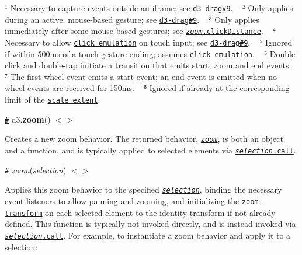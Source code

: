 ¹ Necessary to capture events outside an iframe; see \href{https://github.com/d3/d3-drag/issues/9}{\tt d3-\/drag\#9}. ~\newline
² Only applies during an active, mouse-\/based gesture; see \href{https://github.com/d3/d3-drag/issues/9}{\tt d3-\/drag\#9}. ~\newline
³ Only applies immediately after some mouse-\/based gestures; see \href{#zoom_clickDistance}{\tt {\itshape zoom}.click\+Distance}. ~\newline
⁴ Necessary to allow \href{https://developer.apple.com/library/ios/documentation/AppleApplications/Reference/SafariWebContent/HandlingEvents/HandlingEvents.html#//apple_ref/doc/uid/TP40006511-SW7}{\tt click emulation} on touch input; see \href{https://github.com/d3/d3-drag/issues/9}{\tt d3-\/drag\#9}. ~\newline
⁵ Ignored if within 500ms of a touch gesture ending; assumes \href{https://developer.apple.com/library/ios/documentation/AppleApplications/Reference/SafariWebContent/HandlingEvents/HandlingEvents.html#//apple_ref/doc/uid/TP40006511-SW7}{\tt click emulation}. ~\newline
⁶ Double-\/click and double-\/tap initiate a transition that emits start, zoom and end events. ~\newline
⁷ The first wheel event emits a start event; an end event is emitted when no wheel events are received for 150ms. ~\newline
⁸ Ignored if already at the corresponding limit of the \href{#zoom_scaleExtent}{\tt scale extent}.

\href{#zoom}{\tt \#} d3.{\bfseries zoom}() \href{https://github.com/d3/d3-zoom/blob/master/src/zoom.js}{\tt $<$$>$}

Creates a new zoom behavior. The returned behavior, \href{#_drag}{\tt {\itshape zoom}}, is both an object and a function, and is typically applied to selected elements via \href{https://github.com/d3/d3-selection#selection_call}{\tt {\itshape selection}.call}.

\href{#_zoom}{\tt \#} {\itshape zoom}({\itshape selection}) \href{https://github.com/d3/d3-zoom/blob/master/src/zoom.js#L62}{\tt $<$$>$}

Applies this zoom behavior to the specified \href{https://github.com/d3/d3-selection}{\tt {\itshape selection}}, binding the necessary event listeners to allow panning and zooming, and initializing the \href{#zoom-transforms}{\tt zoom transform} on each selected element to the identity transform if not already defined. This function is typically not invoked directly, and is instead invoked via \href{https://github.com/d3/d3-selection#selection_call}{\tt {\itshape selection}.call}. For example, to instantiate a zoom behavior and apply it to a selection\+:


